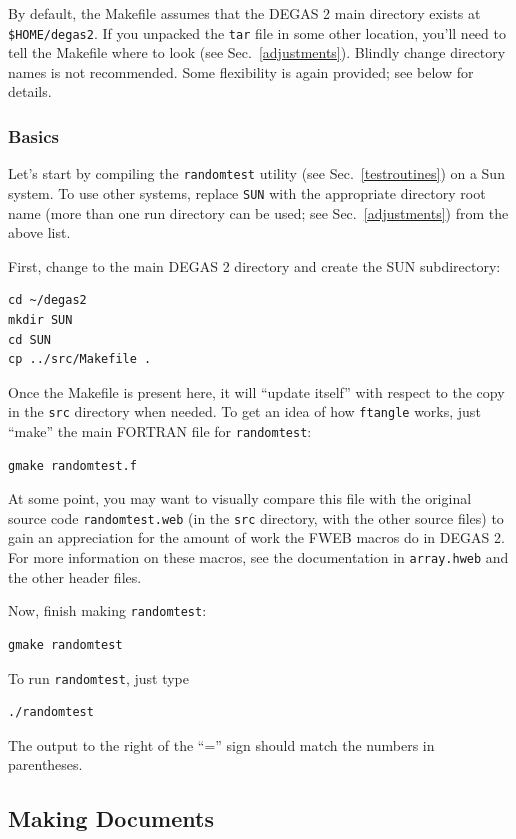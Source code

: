 \documentclass[12pt]{report}
\begin{document}
By default, the Makefile assumes that the DEGAS 2 main directory
exists at \verb+$HOME/degas2+. If you unpacked the {\tt tar} file
in some other location, you'll need to tell the Makefile where to look
(see Sec.~\ref{adjustments}). 
Blindly change directory names is not recommended.
Some flexibility is again provided; see below for details.

\subsubsection{Basics}
\label{basics}

Let's start by compiling the {\tt randomtest} utility (see 
Sec.~\ref{testroutines}) on a Sun system. To use other systems,
replace {\tt SUN} with the appropriate directory root name (more than
one run directory can be used; see Sec.~\ref{adjustments}) from the above list.

First, change to the main DEGAS 2 directory and create the SUN 
subdirectory:
\begin{verbatim}
cd ~/degas2
mkdir SUN
cd SUN
cp ../src/Makefile .
\end{verbatim}

Once the Makefile is present here, it will ``update itself'' with respect
to the copy in the {\tt src} directory when needed. To get an idea of
how {\tt ftangle} works, just ``make'' the main FORTRAN file for 
{\tt randomtest}:
\begin{verbatim}
gmake randomtest.f
\end{verbatim}
At some point, you may want to visually compare this file with the
original source code {\tt randomtest.web} (in the {\tt src} directory, with
the other source files) to gain an appreciation
for the amount of work the FWEB macros do in DEGAS 2. For more information
on these macros, see the documentation in {\tt array.hweb} and the
other header files.

Now, finish making {\tt randomtest}:
\begin{verbatim}
gmake randomtest
\end{verbatim}

To run {\tt randomtest}, just type
\begin{verbatim}
./randomtest
\end{verbatim}
The output to the right of the ``='' sign should match the numbers in
parentheses.

\subsection{Making Documents}
\end{document}
